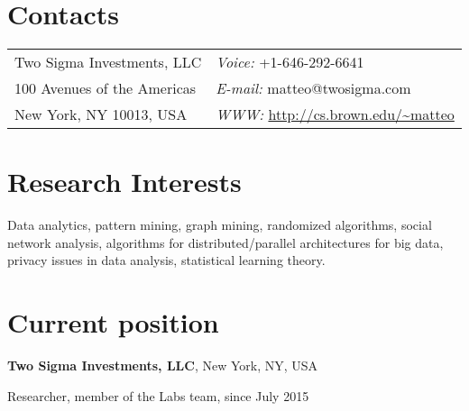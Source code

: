 \documentclass[margin,line]{resume}
\newif\ifwebversion
\begin{document}
\begin{resume}

  \section{\sc Contacts}
\vspace{.05in}

	\begin{tabular}{@{}p{2.8in}p{3.2in}}
	Two Sigma Investments, LLC & {\it Voice:} +1-646-292-6641 \\
	100 Avenues of the Americas & {\it E-mail:}  matteo@twosigma.com  \\
	New York, NY 10013, USA &  {\it WWW:} \url{http://cs.brown.edu/~matteo}  \\
	\end{tabular}


\section{\sc Research Interests}

{Data analytics, pattern mining, graph mining, randomized algorithms, social
network analysis, algorithms for distributed/parallel architectures for big
data, privacy issues in data analysis, statistical learning theory.}

\section{\sc Current position}
{\bf Two Sigma Investments, LLC}, New York, NY, USA\\
\vspace*{-.18in}
\begin{list1}
\item[] Researcher, member of the Labs team, since July 2015
\end{list1}


\end{resume}
\end{document}
